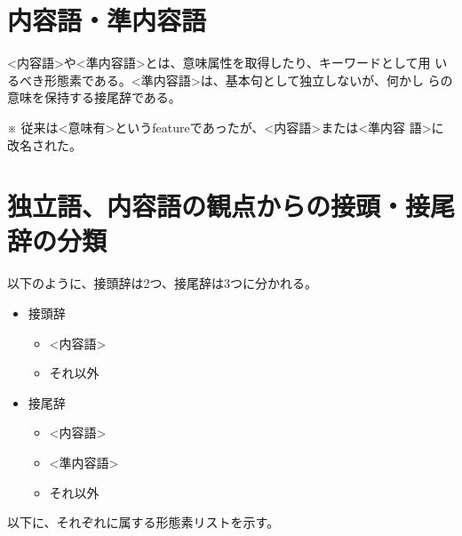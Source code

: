 \documentclass[a4j]{jarticle}
\newcommand{\sm}[1]{\textless #1\textgreater}
\begin{document}


\section{内容語・準内容語}

\sm{内容語}や\sm{準内容語}とは、意味属性を取得したり、キーワードとして用
いるべき形態素である。\sm{準内容語}は、基本句として独立しないが、何かし
らの意味を保持する接尾辞である。


※ 従来は\sm{意味有}というfeatureであったが、\sm{内容語}または\sm{準内容
語}に改名された。


\section{独立語、内容語の観点からの接頭・接尾辞の分類}
\label{Section::PrefixSuffix}

以下のように、接頭辞は2つ、接尾辞は3つに分かれる。
\begin{itemize}
 \item 接頭辞
       \begin{itemize}
	\item \sm{内容語}
	\item それ以外
       \end{itemize}
 \item 接尾辞
       \begin{itemize}
	\item \sm{内容語}
	\item \sm{準内容語}
	\item それ以外
       \end{itemize}
\end{itemize}

\vspace*{2ex}

以下に、それぞれに属する形態素リストを示す。
\end{document}
